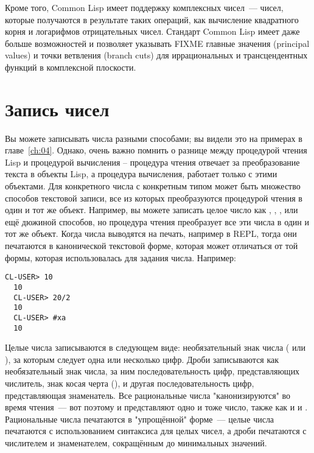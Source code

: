 Кроме того, Common Lisp имеет поддержку комплексных чисел~--- чисел, которые получаются в
результате таких операций, как вычисление квадратного корня и логарифмов отрицательных
чисел. Стандарт Common Lisp имеет даже больше возможностей и позволяет указывать FIXME
главные значения (principal values) и точки ветвления (branch cuts) для иррациональных и
трансцендентных функций в комплексной плоскости.

\section{Запись чисел}

Вы можете записывать числа разными способами; вы видели это на примерах в
главе~\ref{ch:04}.  Однако, очень важно помнить о разнице между процедурой чтения Lisp и
процедурой вычисления -- процедура чтения отвечает за преобразование текста в объекты
Lisp, а процедура вычисления, работает только с этими объектами.  Для конкретного числа с
конкретным типом может быть множество способов текстовой записи, все из которых
преобразуются процедурой чтения в один и тот же объект.  Например, вы можете записать
целое число  как , , , или ещё дюжиной способов,
но процедура чтения преобразует все эти числа в один и тот же объект.  Когда числа
выводятся на печать, например в REPL, тогда они печатаются в канонической текстовой форме,
которая может отличаться от той формы, которая использовалась для задания числа.
Например:

\begin{lstlisting}[style=lisprepl]
  CL-USER> 10
  10
  CL-USER> 20/2
  10
  CL-USER> #xa
  10
\end{lstlisting}

Целые числа записываются в следующем виде: необязательный знак числа (\code{+} или
\code{-}), за которым следует одна или несколько цифр.  Дроби записываются как
необязательный знак числа, за ним последовательность цифр, представляющих числитель, знак
косая черта (\code{/}), и другая последовательность цифр, представляющая знаменатель.  Все
рациональные числа "канонизируются" во время чтения~--- вот поэтому  и 
представляют одно и тоже число, также как и  и .  Рациональные числа
печатаются в "упрощённой" форме~--- целые числа печатаются с использованием синтаксиса для
целых чисел, а дроби печатаются с числителем и знаменателем, сокращённым до минимальных
значений.

